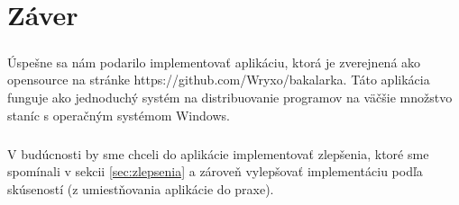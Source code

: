 \chapter*{Záver}
\paragraph{}
Úspešne sa nám podarilo implementovať aplikáciu, ktorá je zverejnená ako opensource na stránke https://github.com/Wryxo/bakalarka. Táto aplikácia funguje ako jednoduchý systém na distribuovanie programov na väčšie množstvo staníc s operačným systémom Windows.
\paragraph{}
V budúcnosti by sme chceli do aplikácie implementovať zlepšenia, ktoré sme spomínali v sekcii \ref{sec:zlepsenia} a zároveň vylepšovať implementáciu podľa skúseností (z umiestňovania aplikácie do praxe).